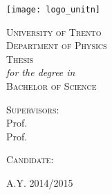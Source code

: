 
\graphicspath{{Frontmatter/figures/PNG/}{Frontmatter/figures/PDF/}{Frontmatter/figures/}}

\begin{titlepage}
	
	\begin{center}
	
		\texttt{[image: logo\_unitn]}\\[0.4cm]
			
		\vspace{0.8cm}
		
		{ \Huge \scshape University of Trento }\\[0.25cm]
		{ \Large \scshape Department of Physics }\\[2cm]

		{ \Large \scshape Thesis }\\[0.05cm]
		{ \itshape for the degree in }\\[0.05cm]
		{ \Large \scshape Bachelor of Science }\\[2cm]
		
		
		{ \huge \bfseries \THtitle }
		
		\vfill
				
		\begin{minipage}[t]{0.45\textwidth}
			\begin{flushleft} %
				{ \large \scshape Supervisors: } \\[0.25cm]
				{ Prof. \THsupervisor }\\[0.10cm]
				{ Prof. \THextrasupervisor }
			\end{flushleft}
		\end{minipage}
		\begin{minipage}[t]{0.45\textwidth}
			\begin{flushright} %
				{ \large \scshape Candidate: }\\[0.25cm]
				{ \THauthor }
			\end{flushright}
		\end{minipage}
		
		\vspace{2cm}
		
		{\large \scshape A.Y. 2014/2015}
		
	\end{center}
	
	\restoregeometry
\end{titlepage}